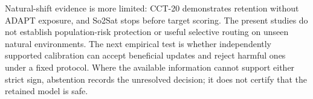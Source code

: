 Natural-shift evidence is more limited: CCT-20 demonstrates retention without ADAPT exposure,
and So2Sat stops before target scoring. The present studies do not establish population-risk
protection or useful selective routing on unseen natural environments. The next empirical test
is whether independently supported calibration can accept beneficial updates and reject harmful
ones under a fixed protocol. Where the available information cannot support either strict sign,
abstention records the unresolved decision; it does not certify that the retained model is safe.
